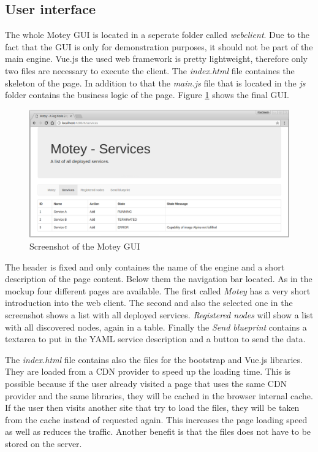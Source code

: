 \subsection{User interface}
The whole Motey \ac{GUI} is located in a seperate folder called \textit{webclient}.
Due to the fact that the \ac{GUI} is only for demonstration purposes, it should not be part of the main engine.
Vue.js the used web framework is pretty lightweight, therefore only two files are necessary to execute the client.
The \textit{index.html} file containes the skeleton of the page.
In addition to that the \textit{main.js} file that is located in the \textit{js} folder contains the business logic of the page.
Figure \ref{fig:motey_gui_screenshot} shows the final \ac{GUI}.
\begin{figure}[H]
    \centering
    \includegraphics[width=\textwidth]{resources/images/motey_gui_screenshot.png}
    \caption[Screenshot of the Motey \ac{GUI}]{Screenshot of the Motey \ac{GUI}}
    \label{fig:motey_gui_screenshot}
\end{figure}
The header is fixed and only containes the name of the engine and a short description of the page content.
Below them the navigation bar located.
As in the mockup four different pages are available.
The first called \textit{Motey} has a very short introduction into the web client.
The second and also the selected one in the screenshot shows a list with all deployed services.
\textit{Registered nodes} will show a list with all discovered nodes, again in a table.
Finally the \textit{Send blueprint} contains a textarea to put in the \ac{YAML} service description and a button to send the data.

The \textit{index.html} file contains also the files for the bootstrap and Vue.js libraries.
They are loaded from a \ac{CDN} provider to speed up the loading time.
This is possible because if the user already visited a page that uses the same \ac{CDN} provider and the same libraries, they will be cached in the browser internal cache.
If the user then visits another site that try to load the files, they will be taken from the cache instead of requested again.
This increases the page loading speed as well as reduces the traffic.
Another benefit is that the files does not have to be stored on the server.

